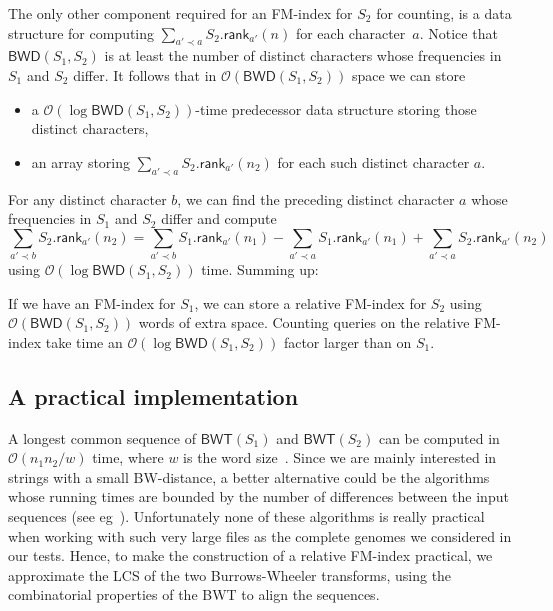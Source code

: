 \documentclass{llncs}
\newcommand{\Oh}[1]
  {\ensuremath{\mathcal{O}\!\left( {#1} \right)}}
\newcommand{\BWD}
  {\ensuremath{\mathsf{BWD}}}
\newcommand{\BWT}
  {\ensuremath{\mathsf{BWT}}}
\newcommand{\rank}
  {\ensuremath{\mathsf{rank}}}
\begin{document}
The only other component required for an FM-index for $S_2$ for counting, is
a data structure for computing  \(\sum_{a' \prec a} S_2.\rank_{a'} (n)\) for
each character~$a$. Notice that \(\BWD (S_1, S_2)\) is at least the number of
distinct characters whose frequencies in $S_1$ and $S_2$ differ. It follows
that in $\Oh{\BWD (S_1, S_2)}$ space we can store
\begin{itemize}
\item a $\Oh{\log \BWD (S_1, S_2)}$-time predecessor data structure
    storing those distinct characters,
\item an array storing \(\sum_{a' \prec a} S_2.\rank_{a'} (n_2)\) for
    each such distinct character $a$.
\end{itemize}
For any distinct character $b$, we can find the preceding distinct character
$a$ whose frequencies in $S_1$ and $S_2$ differ and compute
\[\sum_{a' \prec b} S_2.\rank_{a'} (n_2) = \sum_{a' \prec b} S_1.\rank_{a'} (n_1) - \sum_{a' \prec a} S_1.\rank_{a'} (n_1) + \sum_{a' \prec a} S_2.\rank_{a'} (n_2)\]
using $\Oh{\log \BWD (S_1, S_2)}$ time. Summing up:

\begin{theorem} \label{theo:counting}
If we have an FM-index for $S_1$, we can store a relative FM-index for $S_2$
using $\Oh{\BWD (S_1, S_2)}$ words of extra space. Counting queries on the
relative FM-index take time an $\Oh{\log \BWD (S_1, S_2)}$ factor larger than
on $S_1$.
\end{theorem}







\subsection{A practical implementation} \label{sec:simon&jouni}

A longest common sequence of $\BWT (S_1)$ and $\BWT (S_2)$ can be computed in
$\Oh{n_1 n_2 /w}$ time, where $w$ is the word size~\cite{Myers99}. Since we
are mainly interested in strings with a small BW-distance, a better
alternative could be the algorithms whose running times are bounded by the
number of differences between the input sequences (see
eg~\cite{LandauVN86,Myers86}). Unfortunately none of these algorithms is
really practical when working with such very large files as the complete
genomes we considered in our tests. Hence, to make the construction of a
relative FM-index practical, we approximate the LCS of the two
Burrows-Wheeler transforms, using the combinatorial properties of the BWT to
align the sequences.
\end{document}
